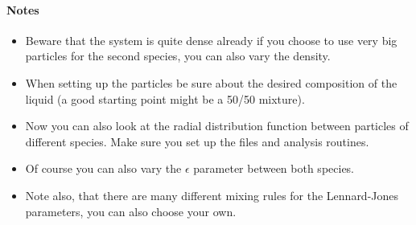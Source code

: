 \documentclass[
paper=a4,                       %
fontsize=11pt,                  %
twoside,                        %
footsepline,                    %
headsepline,                    %
headinclude=false,              %
footinclude=false,              %
pagesize,                       %
]{scrartcl}
\newtheorem{task}{Task}
\begin{document}
\paragraph{Notes} 
\begin{itemize}
	\item Beware that the system is quite dense already if you choose to use very big
		particles for the second species, you can also vary the density.
	\item When setting up the particles be sure about the desired composition of the
		liquid (a good starting point might be a 50/50 mixture). 
	\item Now you can also look at the radial distribution function between particles
		of different species. Make sure you set up the files and analysis routines.
	\item Of course you can also vary the $\epsilon$ parameter between both species. 
	\item Note also, that there are many different mixing rules for the Lennard-Jones
		parameters, you can also choose your own. 
\end{itemize}

\newpage

%
%        
%
%
%
%



\end{document}
